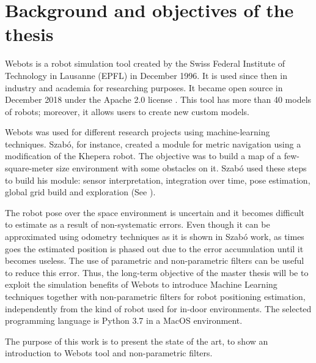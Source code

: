 \section{Background and objectives of the thesis}

Webots is a robot simulation tool created by the Swiss Federal Institute of Technology in Lausanne (EPFL) in December 1996. It is used since then in industry and academia for researching purposes. It became open source in December 2018 under the Apache 2.0 license \cite{cyberbotics}.  This tool has more than 40 models of robots; moreover, it allows users to create new custom models.


Webots was used for different research projects using machine-learning techniques. Szab\'{o}\cite{szabo}, for instance, created a module for metric navigation using a modification of the Khepera robot. The objective was to build a map of a few-square-meter size environment with some obstacles on it. Szab\'{o} used these steps to build his module: sensor interpretation, integration over time, pose estimation, global grid build and exploration (See \cite{thrun-1}).

The robot pose over the space environment is uncertain and it becomes difficult to estimate as a result of non-systematic errors. Even though it can be approximated using odometry techniques as it is shown in Szab\'{o} work, as times goes the estimated position is phased out due to the error accumulation until it becomes useless. The use of parametric and non-parametric filters can be useful to reduce this error. Thus, the long-term objective of the master thesis will be to exploit the simulation benefits of Webots to introduce Machine Learning techniques together with non-parametric filters for robot positioning estimation, independently from the kind of robot used for in-door environments. The selected programming language is Python 3.7 in a MacOS environment.

The purpose of this work is to present the state of the art, to show an introduction to Webots tool and non-parametric filters. 
